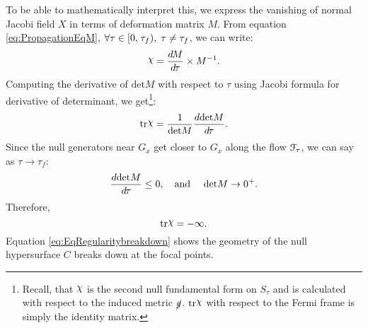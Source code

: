 \documentclass[12pt, a4paper]{report}
\theoremstyle{bfnote}
\newcommand{\chits}{\raisebox{0.5ex}{$\chi$}} %
\begin{document}
To be able to mathematically interpret this, we express the vanishing of normal
Jacobi field $X$ in terms of deformation matrix $M$. From equation
\eqref{eq:PropagationEqM}, $\forall \tau\in[0, \hspace{0.1em}\tau_f), \; \tau \neq \tau_f$, we
can write:
\begin{equation*}
    \chits = \frac{d\hspace{-0.1em}M}{d\hspace{-0.1em}\tau} \times M^{-1}.
\end{equation*}
Computing the derivative of $\mathrm{det}M$ with respect to $\tau$ using Jacobi
formula for derivative of determinant, we get\footnote[5]{Recall, that $\chits$
is the second null fundamental form on $S_\tau$ and is calculated with respect
to the induced metric $\cancel{g}$. $\mathrm{tr}\chits$ with respect to the
Fermi frame is simply the identity matrix.}:
\begin{equation}{\label{eq:trXderivativedetM}}
    \mathrm{tr}\chits = \frac{1}{\mathrm{det}M}\frac{d\mathrm{det}M}{d\hspace{-0.1em}\tau}.
\end{equation}
Since the null generators near $G_x$ get closer to $G_x$ along the flow
$\mathcal{F}_{\hspace{-0.1em}\tau}$, we can say as $\tau \to \tau_f$:
\begin{equation*}
    \frac{d\mathrm{det}M}{d\hspace{-0.1em}\tau} \leq 0, \quad \text{and } \quad \mathrm{det}M \to 0^+.
\end{equation*}
Therefore,
\begin{equation}{\label{eq:EqRegularitybreakdown}}
    \mathrm{tr}\chits = -\infty.
\end{equation}
Equation \eqref{eq:EqRegularitybreakdown} shows the geometry of the null hypersurface
$C$ breaks down at the focal points.
 








\end{document}
